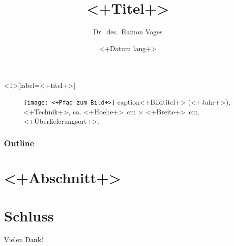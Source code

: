 \documentclass{beamer}
\author{Dr.\ des.\ Ramon Voges}
\institute{<+Universität+>}
\title{<+Titel+>}
\date[<+Kurzdatum+>]{<+Datum lang+>}
\begin{document}
\maketitle


\begin{frame}<1>[label=<+titel+>]
\begin{figure}
\texttt{[image: <+Pfad zum Bild+>]}
caption{<+Bildtitel+> (<+Jahr+>), <+Technik+>, ca. \SI{<+Hoehe+>}{cm} $ \times $ \SI{<+Breite+>}{cm}, <+Überlieferungsort+>.}
\end{figure}
\end{frame}


\begin{frame}
\frametitle{Outline}
\end{frame}

\section{<+Abschnitt+>}
\label{sec:<+abschnitt+>}


%

\section{Schluss}
\label{sec:schluss}

\begin{frame}[]
\huge Vielen Dank!
\end{frame}
\end{document}
